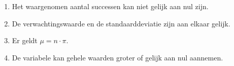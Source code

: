 \begin{enumerate}[label=(\alph*)]
    \item Het waargenomen aantal successen kan niet gelijk aan nul zijn.
    \item De verwachtingswaarde en de standaarddeviatie zijn aan elkaar gelijk.
    \item Er geldt $\mu = n \cdot \pi$.
    \item De variabele kan gehele waarden groter of gelijk aan nul aannemen.
\end{enumerate}
